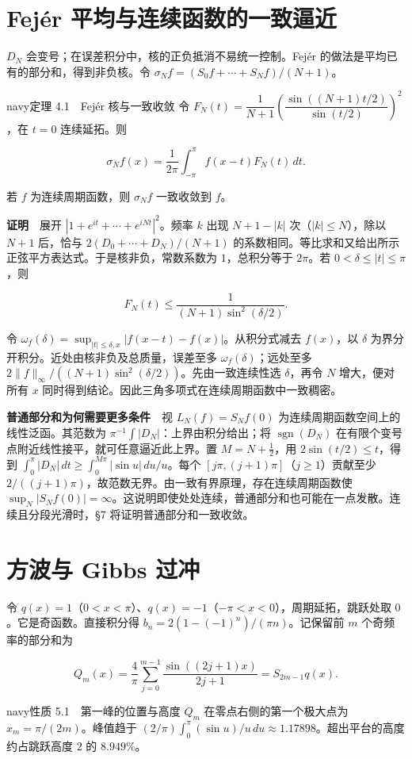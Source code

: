 \documentclass[12pt,a4paper]{article}
\newcommand{\mysection}[1]{\clearpage\section{#1}}
\begin{document}
\mysection{Fejér 平均与连续函数的一致逼近}


\(D_N\) 会变号；在误差积分中，核的正负抵消不易统一控制。Fejér 的做法是平均已有的部分和，得到非负核。令 \(\sigma_N f=(S_0f+\cdots+S_Nf)/(N+1)\)。

\begin{sboxenv}{navy}{定理 4.1　Fejér 核与一致收敛}
令 \(F_N(t)=\dfrac1{N+1}\left(\dfrac{\sin((N+1)t/2)}{\sin(t/2)}\right)^2\)，在 \(t=0\) 连续延拓。则

\[
\sigma_N f(x)=\frac1{2\pi}\int_{-\pi}^{\pi} f(x-t)F_N(t)\,dt.
\]

若 \(f\) 为连续周期函数，则 \(\sigma_N f\) 一致收敛到 \(f\)。
\end{sboxenv}

\textbf{证明}　展开 \(|1+e^{it}+\cdots+e^{iNt}|^2\)。频率 \(k\) 出现 \(N+1-|k|\) 次（\(|k|\le N\)），除以 \(N+1\) 后，恰与 \(2(D_0+\cdots+D_N)/(N+1)\) 的系数相同。等比求和又给出所示正弦平方表达式。于是核非负，常数系数为 \(1\)，总积分等于 \(2\pi\)。若 \(0<\delta\le |t|\le\pi\)，则

\[
 F_N(t)\le\frac{1}{(N+1)\sin^2(\delta/2)} .
\]

令 \(\omega_f(\delta)=\sup_{|t|\le\delta,x}|f(x-t)-f(x)|\)。从积分式减去 \(f(x)\)，以 \(\delta\) 为界分开积分。近处由核非负及总质量，误差至多 \(\omega_f(\delta)\)；远处至多 \(2\|f\|_\infty/((N+1)\sin^2(\delta/2))\)。先由一致连续性选 \(\delta\)，再令 \(N\) 增大，便对所有 \(x\) 同时得到结论。因此三角多项式在连续周期函数中一致稠密。

\textbf{普通部分和为何需要更多条件}　视 \(L_N(f)=S_N f(0)\) 为连续周期函数空间上的线性泛函。其范数为 \(\pi^{-1}\int|D_N|\)：上界由积分给出；将 \(\operatorname{sgn}(D_N)\) 在有限个变号点附近线性接平，就可任意逼近此上界。置 \(M=N+\tfrac12\)，用 \(2\sin(t/2)\le t\)，得到 \(\int_0^\pi |D_N|\,dt\ge\int_0^{M\pi}|\sin u|\,du/u\)。每个 \([j\pi,(j+1)\pi]\)（\(j\ge1\)）贡献至少 \(2/((j+1)\pi)\)，故范数无界。由一致有界原理，存在连续周期函数使 \(\sup_N|S_N f(0)|=\infty\)。这说明即使处处连续，普通部分和也可能在一点发散。连续且分段光滑时，§7 将证明普通部分和一致收敛。

\mysection{方波与 Gibbs 过冲}


令 \(q(x)=1\)（\(0<x<\pi\)）、\(q(x)=-1\)（\(-\pi<x<0\)），周期延拓，跳跃处取 \(0\)。它是奇函数。直接积分得 \(b_n=2(1-(-1)^n)/(\pi n)\)。记保留前 \(m\) 个奇频率的部分和为

\[
 Q_m(x)=\frac4\pi\sum_{j=0}^{m-1}\frac{\sin((2j+1)x)}{2j+1}=S_{2m-1}q(x).
\]

\begin{sboxenv}{navy}{性质 5.1　第一峰的位置与高度}
\(Q_m\) 在零点右侧的第一个极大点为 \(x_m=\pi/(2m)\)。峰值趋于 \((2/\pi)\int_0^\pi(\sin u)/u\,du\approx1.17898\)。超出平台的高度约占跳跃高度 \(2\) 的 \(8.949\%\)。
\end{sboxenv}
\end{document}
